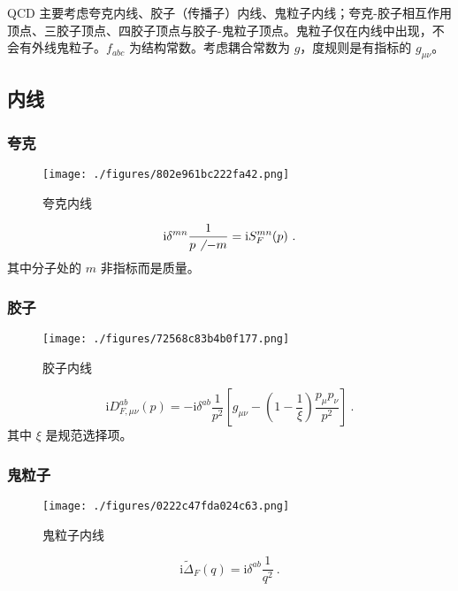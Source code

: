 

\begin{issues}
\issueMissDepend
\issueAbstract
\end{issues}

QCD 主要考虑夸克内线、胶子（传播子）内线、鬼粒子内线；夸克-胶子相互作用顶点、三胶子顶点、四胶子顶点与胶子-鬼粒子顶点。鬼粒子仅在内线中出现，不会有外线鬼粒子。$f_{abc}$ 为结构常数。考虑耦合常数为 $g$，度规则是有指标的 $g_{\mu\nu}$。

\subsection{内线}
\subsubsection{夸克}
\begin{figure}[ht]
\centering
\texttt{[image: ./figures/802e961bc222fa42.png]}
\caption{夸克内线} \label{fig_qcdfey_1}
\end{figure}
\begin{equation}
\mathrm i \delta^{mn} \frac{1}{ p\not ~- m} = \mathrm i S^{mn}_F(p)~.
\end{equation}
其中分子处的 $m$ 非指标而是质量。

\subsubsection{胶子}
\begin{figure}[ht]
\centering
\texttt{[image: ./figures/72568c83b4b0f177.png]}
\caption{胶子内线} \label{fig_qcdfey_2}
\end{figure}
\begin{equation}
\mathrm i D_{F, \mu\nu}^{ab}(p) = -\mathrm i \delta^{ab} \frac{1}{p^2} \left[ g_{\mu\nu} - \left(1-\frac{1}{\xi}\right) \frac{p_\mu p_\nu}{p^2} \right] ~.
\end{equation}
其中 $\xi$ 是规范选择项。

\subsubsection{鬼粒子}
\begin{figure}[ht]
\centering
\texttt{[image: ./figures/0222c47fda024c63.png]}
\caption{鬼粒子内线} \label{fig_qcdfey_3}
\end{figure}
\begin{equation}
\mathrm i \widetilde{\Delta}_F(q) = \mathrm i \delta^{ab} \frac{1}{q^2} ~.
\end{equation}

